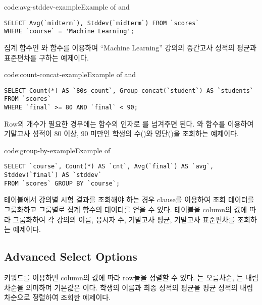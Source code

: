\begin{code}{code:avg-stddev-example}{Example of  and }
\begin{verbatim}
SELECT Avg(`midterm`), Stddev(`midterm`) FROM `scores`
WHERE `course` = 'Machine Learning';
\end{verbatim}
\end{code}

\은 집계 함수인 와  함수를 이용하여 ``Machine Learning'' 강의의 중간고사 성적의 평균과 표준편차를 구하는 예제이다.

\begin{code}{code:count-concat-example}{Example of  and }
\begin{verbatim}
SELECT Count(*) AS `80s_count`, Group_concat(`student`) AS `students` FROM `scores`
WHERE `final` >= 80 AND `final` < 90;
\end{verbatim}
\end{code}

Row의 개수가 필요한 경우에는  함수의 인자로 \cd{*}를 넘겨주면 된다. \은 와  함수를 이용하여 기말고사 성적이 80 이상, 90 미만인 학생의 수()와 명단()을 조회하는 예제이다.

\begin{code}{code:group-by-example}{Example of }
\begin{verbatim}
SELECT `course`, Count(*) AS `cnt`, Avg(`final`) AS `avg`, Stddev(`final`) AS `stddev`
FROM `scores` GROUP BY `course`;
\end{verbatim}
\end{code}

 테이블에서 강의별 시험 결과를 조회해야 하는 경우  clause를 이용하여 조회 데이터를 그룹화하고 그룹별로 집계 함수의 데이터를 얻을 수 있다. \은  테이블을  column의 값에 따라 그룹화하여 각 강의의 이름, 응시자 수, 기말고사 평균, 기말고사 표준편차를 조회하는 예제이다.

\subsection*{Advanced Select Options}

 키워드를 이용하면 column의 값에 따라 row들을 정렬할 수 있다. 는 오름차순, 는 내림차순을 의미하며 기본값은 이다. \은 학생의 이름과 최종 성적의 평균을 평균 성적의 내림차순으로 정렬하여 조회한 예제이다.

